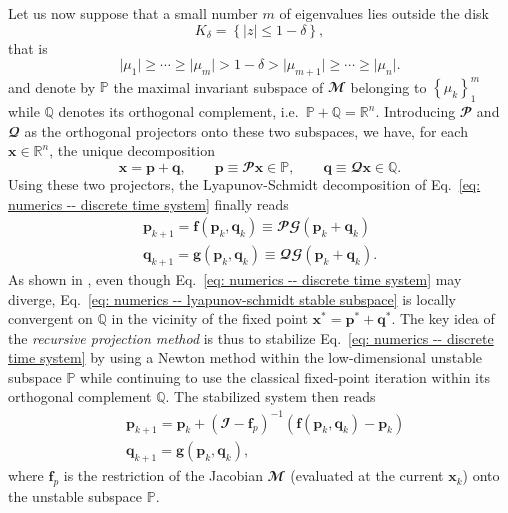     Let us now suppose that a small number $m$ of eigenvalues lies outside the disk
    $$K_{\delta} = \left\{ \vert z \vert \leq 1-\delta \right\},$$
    that is
    $$\vert \mu_1 \vert \geq \cdots \geq \vert \mu_m \vert > 1 - \delta > \vert \mu_{m+1} \vert \geq \cdots \geq \vert \mu_{n} \vert.$$
    and denote by $\mathbb{P}$ the maximal invariant subspace of $\mathbfcal{M}$ belonging to $\left\{ \mu_k \right\}_1^m$ while $\mathbb{Q}$ denotes its orthogonal complement, i.e.\ $\mathbb{P} + \mathbb{Q} = \mathbb{R}^n$. Introducing $\mathbfcal{P}$ and $\mathbfcal{Q}$ as the orthogonal projectors onto these two subspaces, we have, for each $\mathbf{x} \in \mathbb{R}^n$, the unique decomposition
    \begin{equation}
      \mathbf{x} = \mathbf{p} + \mathbf{q}, \qquad \mathbf{p} \equiv \mathbfcal{P} \mathbf{x} \in \mathbb{P}, \qquad \mathbf{q} \equiv \mathbfcal{Q} \mathbf{x} \in \mathbb{Q}.
      \label{eq: numerics -- orthogonal decomposition}
    \end{equation}
    Using these two projectors, the Lyapunov-Schmidt decomposition of Eq.\ \eqref{eq: numerics -- discrete time system} finally reads
    \begin{eqnarray}
        \label{eq: numerics -- lyapunov-schmidt unstable subspace}
        \mathbf{p}_{k+1} = \bm{f}\left( \mathbf{p}_k, \mathbf{q}_k \right) \equiv \mathbfcal{P} \mathbfcal{G}\left( \mathbf{p}_k + \mathbf{q}_k \right)\\
        \label{eq: numerics -- lyapunov-schmidt stable subspace}
        \mathbf{q}_{k+1} = \bm{g}\left( \mathbf{p}_k, \mathbf{q}_k \right) \equiv \mathbfcal{Q} \mathbfcal{G}\left( \mathbf{p}_k + \mathbf{q}_k \right).
    \end{eqnarray}
    As shown in \cite{siam:shroff:1993}, even though Eq.\ \eqref{eq: numerics -- discrete time system} may diverge, Eq.\ \eqref{eq: numerics -- lyapunov-schmidt stable subspace} is locally convergent on $\mathbb{Q}$ in the vicinity of the fixed point $\mathbf{x}^* = \mathbf{p}^* + \mathbf{q}^*$. The key idea of the \emph{recursive projection method} is thus to stabilize Eq.\ \eqref{eq: numerics -- discrete time system} by using a Newton method within the low-dimensional unstable subspace $\mathbb{P}$ while continuing to use the classical fixed-point iteration within its orthogonal complement $\mathbb{Q}$. The stabilized system then reads
    \begin{equation}
      \begin{aligned}
        & \mathbf{p}_{k+1} = \mathbf{p}_k + \left( \mathbfcal{I} - \bm{f}_p \right)^{-1} \left( \bm{f}\left(\mathbf{p}_k, \mathbf{q}_k \right) - \mathbf{p}_k \right) \\
        & \mathbf{q}_{k+1} = \bm{g}\left( \mathbf{p}_k, \mathbf{q}_k \right),
      \end{aligned}
      \label{eq: numerics -- stabilized rpm system}
    \end{equation}
    where $\bm{f}_p$ is the restriction of the Jacobian $\mathbfcal{M}$ (evaluated at the current $\mathbf{x}_k$) onto the unstable subspace $\mathbb{P}$.

